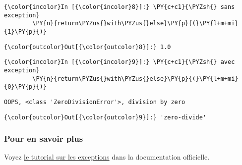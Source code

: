     \begin{Verbatim}[commandchars=\\\{\}]
{\color{incolor}In [{\color{incolor}8}]:} \PY{c+c1}{\PYZsh{} sans exception}
        \PY{n}{return\PYZus{}with\PYZus{}else}\PY{p}{(}\PY{l+m+mi}{1}\PY{p}{)}
\end{Verbatim}


\begin{Verbatim}[commandchars=\\\{\}]
{\color{outcolor}Out[{\color{outcolor}8}]:} 1.0
\end{Verbatim}
            
    \begin{Verbatim}[commandchars=\\\{\}]
{\color{incolor}In [{\color{incolor}9}]:} \PY{c+c1}{\PYZsh{} avec exception}
        \PY{n}{return\PYZus{}with\PYZus{}else}\PY{p}{(}\PY{l+m+mi}{0}\PY{p}{)}
\end{Verbatim}


    \begin{Verbatim}[commandchars=\\\{\}]
OOPS, <class 'ZeroDivisionError'>, division by zero

    \end{Verbatim}

\begin{Verbatim}[commandchars=\\\{\}]
{\color{outcolor}Out[{\color{outcolor}9}]:} 'zero-divide'
\end{Verbatim}
            
    \hypertarget{pour-en-savoir-plus}{%
\subsubsection{Pour en savoir plus}\label{pour-en-savoir-plus}}

    Voyez
\href{https://docs.python.org/3/tutorial/errors.html\#handling-exceptions}{le
tutorial sur les exceptions} dans la documentation officielle.